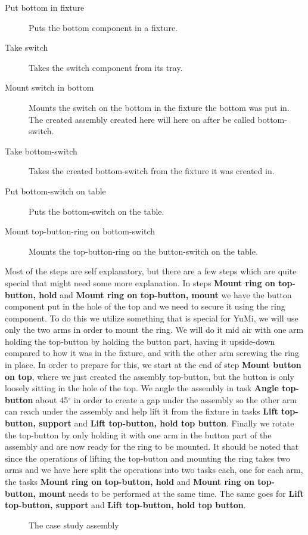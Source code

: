 \begin{description}
\item[Put bottom in fixture] Puts the bottom component in a fixture.

\item[Take switch] Takes the switch component from its tray.

\item[Mount switch in bottom] Mounts the switch on the bottom in the fixture the bottom was put in. The created assembly created here will here on after be called bottom-switch.

\item[Take bottom-switch] Takes the created bottom-switch from the fixture it was created in.

\item[Put bottom-switch on table] Puts the bottom-switch on the table.

\item[Mount top-button-ring on bottom-switch] Mounts the top-button-ring on the button-switch on the table.
\end{description}

\noindent Most of the steps are self explanatory, but there are a few steps which are quite special that might need some more explanation. In steps \textbf{Mount ring on top-button, hold} and \textbf{Mount ring on top-button, mount} we have the button component put in the hole of the top and we need to secure it using the ring component. To do this we utilize something that is special for YuMi\textsuperscript\textregistered, we will use only the two arms in order to mount the ring. We will do it mid air with one arm holding the top-button by holding the button part, having it upside-down compared to how it was in the fixture, and with the other arm screwing the ring in place. In order to prepare for this, we start at the end of step \textbf{Mount button on top}, where we just created the assembly top-button, but the button is only loosely sitting in the hole of the top. We angle the assembly in task \textbf{Angle top-button} about 45$^\circ$ in order to create a gap under the assembly so the other arm can reach under the assembly and help lift it from the fixture in tasks \textbf{Lift top-button, support} and \textbf{Lift top-button, hold top button}. Finally we rotate the top-button by only holding it with one arm in the button part of the assembly and are now ready for the ring to be mounted.
It should be noted that since the operations of lifting the top-button and mounting the ring takes two arms and we have here split the operations into two tasks each, one for each arm, the tasks \textbf{Mount ring on top-button, hold} and \textbf{Mount ring on top-button, mount} needs to be performed at the same time. The same goes for  \textbf{Lift top-button, support} and \textbf{Lift top-button, hold top button}.

\begin{landscape}
\begin{figure}

\caption{The case study assembly}
\label{fig:assembly}
\end{figure}
\end{landscape}

%